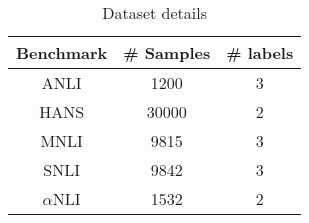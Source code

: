 
\begin{table}
  \centering
  \begin{tabular}{c|c|c}
    Benchmark & \# Samples & \# labels \\
    \hline
    ANLI & 1200 & 3 \\
    HANS & 30000 & 2 \\
    MNLI & 9815 & 3 \\
    SNLI & 9842 & 3 \\
    $\alpha$NLI & 1532 & 2 \\
  \end{tabular}
\caption{Dataset details}
\label{tab:dataset}
\end{table}
